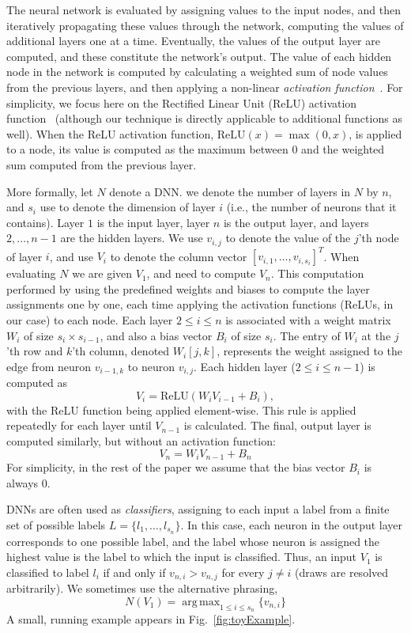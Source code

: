 \documentclass{easychair}
\DeclareMathOperator*{\argmax}{arg\,max}
\newcommand{\relu}{\text{ReLU}\xspace{}}
\newcommand{\guy}[1]{\marginpar{\textcolor{orange}{Guy: #1}}}
\begin{document}
The neural network is evaluated by assigning values to the input
nodes, and then iteratively propagating these values through the
network, computing the values of additional layers one at a
time. Eventually, the values of the output layer are computed, and
these constitute the network's output.  The value of each hidden node
in the network is computed by calculating a weighted sum of node
values from the previous layers, and then applying a non-linear
\emph{activation function}~\cite{FoBeCu16}.  For simplicity, we focus
here on the Rectified Linear Unit (ReLU) activation
function~\cite{NaHi10} (although our technique is directly applicable
to additional functions as well).  When the ReLU activation function,
$\relu{}(x) = \max{}(0, x)$, is applied to a node, its value is
computed as the maximum between $0$ and the weighted sum computed from
the previous layer.

More formally, let $N$ denote a DNN. we
denote the number of layers in $N$ by $n$, and $s_i$ use to denote the
dimension of layer $i$ (i.e., the number of neurons that it contains).
Layer $1$ is the input layer, layer $n$ is the output layer, and
layers $2,\ldots,n-1$ are the hidden layers.
We use $v_{i,j}$  to denote the value of the $j$'th node of layer $i$,
and use $V_i$ to denote the column vector $[v_{i,1},\ldots,v_{i,s_i}]^T$.
When evaluating $N$ we are given $V_1$, and need to compute $V_n$.
This computation 
performed by using the predefined weights and biases to compute the
layer assignments one by one, each time applying the activation
functions (ReLUs, in our case) to each node. Each layer $2\leq i\leq
n$
is associated
with a 
weight matrix $W_i$ of size $s_{i}\times s_{i-1}$, and also a bias vector $B_i$ of size
$s_i$. The entry of $W_i$ at the $j$'th row and $k$'th column, denoted
$W_i[j,k]$, represents the weight assigned to the edge from
neuron $v_{i-1,k}$ to neuron $v_{i,j}$.
Each hidden layer ($2\leq i \leq n-1$) 
is computed as
\[
V_i = \relu{}(W_i  V_{i-1} + B_i),
\]
with the ReLU
function being applied element-wise.
This rule is applied repeatedly for each layer until $V_{n-1}$ is
calculated.
The final, output layer is
computed similarly, but without an activation function:
\[
  V_n = W_i  V_{n-1} + B_n
\]
For simplicity, in the rest of the paper we assume that
the bias vector $B_i$ is always $0$.

DNNs are often used as \emph{classifiers}, assigning to each input a
label from a finite set of possible labels $L=\{l_1,\ldots,l_{s_n}\}$. In this case, each neuron
in the output layer corresponds to one possible label, and the label
whose neuron is assigned the highest value is the label to which the
input is classified. Thus, an input $V_1$ is classified to label $l_i$
if and only if $v_{n,i}>v_{n,j}$ for every $j\neq i$ (draws are
resolved arbitrarily). We sometimes use the alternative phrasing,
\[
  N(V_1) = \argmax_{1\leq i\leq s_n}\{v_{n,i}\}
\]
A small, running example appears in Fig.~\ref{fig:toyExample}.
\guy{TODO: Ben, please add a toy example, also to serve as our running
  example throughout the paper}
\end{document}
